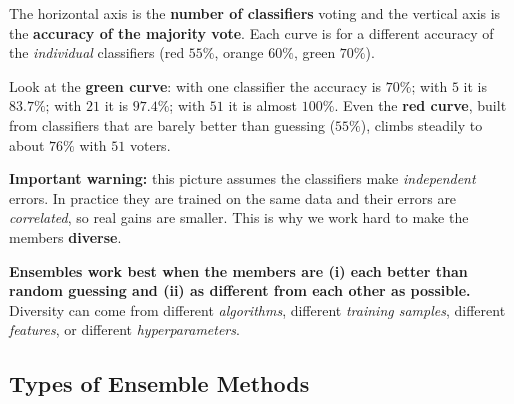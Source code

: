 \begin{explain}
The horizontal axis is the \textbf{number of classifiers} voting and the vertical axis is the \textbf{accuracy of the majority vote}. Each curve is for a different accuracy of the \emph{individual} classifiers (red $55\%$, orange $60\%$, green $70\%$).

\medskip
Look at the \textbf{green curve}: with one classifier the accuracy is $70\%$; with $5$ it is $83.7\%$; with $21$ it is $97.4\%$; with $51$ it is almost $100\%$. Even the \textbf{red curve}, built from classifiers that are barely better than guessing ($55\%$), climbs steadily to about $76\%$ with $51$ voters.

\medskip
\textbf{Important warning:} this picture assumes the classifiers make \emph{independent} errors. In practice they are trained on the same data and their errors are \emph{correlated}, so real gains are smaller. This is why we work hard to make the members \textbf{diverse}.
\end{explain}

\begin{keyidea}
\textbf{Ensembles work best when the members are (i) each better than random guessing and (ii) as different from each other as possible.} Diversity can come from different \emph{algorithms}, different \emph{training samples}, different \emph{features}, or different \emph{hyperparameters}.
\end{keyidea}

\subsection{Types of Ensemble Methods}

